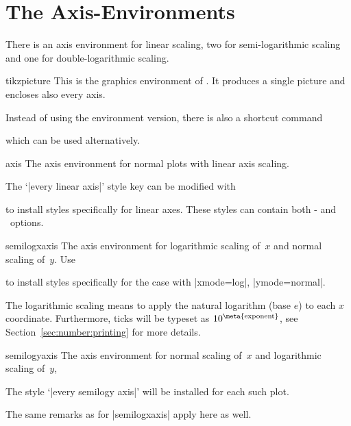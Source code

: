 

\section{The Axis-Environments}
There is an axis environment for linear scaling, two for semi-logarithmic scaling and one for double-logarithmic scaling.
\begin{environment}{{tikzpicture}}
	This is the graphics environment of \Tikz. It produces a single picture and encloses also every axis.

	Instead of using the environment version, there is also a shortcut command 

	\declareandlabel{\tikz}

	which can be used alternatively.
\end{environment}

\begin{environment}{{axis}}
	The axis environment for normal plots with linear axis scaling.

	The `|every linear axis|' style key can be modified with
\begin{codeexample}
\end{codeexample}
to install styles specifically for linear axes. These styles can contain both \Tikz- and \PGFPlots\ options.
\end{environment}

\begin{environment}{{semilogxaxis}}
The axis environment for logarithmic scaling of~$x$ and normal scaling of~$y$.
Use
\begin{codeexample}
\end{codeexample}
to install styles specifically for the case with |xmode=log|, |ymode=normal|.

The logarithmic scaling means to apply the natural logarithm (base $e$) to each $x$ coordinate. Furthermore, ticks will be typeset as $10^{\text{\meta{exponent}}}$, see Section~\ref{sec:number:printing} for more details.
\end{environment}

\begin{environment}{{semilogyaxis}}
The axis environment for normal scaling of~$x$ and logarithmic scaling of~$y$,

The style `|every semilogy axis|' will be installed for each such plot.

The same remarks as for |semilogxaxis| apply here as well.
\end{environment}


